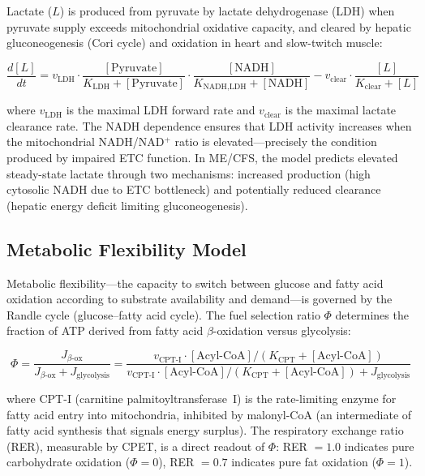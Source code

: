 Lactate ($L$) is produced from pyruvate by lactate dehydrogenase (LDH) when pyruvate supply exceeds mitochondrial oxidative capacity, and cleared by hepatic gluconeogenesis (Cori cycle) and oxidation in heart and slow-twitch muscle:

\begin{equation}
\label{eq:lactate-dynamics}
\frac{d[L]}{dt} = v_{\text{LDH}} \cdot \frac{[\text{Pyruvate}]}{K_{\text{LDH}} + [\text{Pyruvate}]} \cdot \frac{[\text{NADH}]}{K_{\text{NADH,LDH}} + [\text{NADH}]} - v_{\text{clear}} \cdot \frac{[L]}{K_{\text{clear}} + [L]}
\end{equation}

where $v_{\text{LDH}}$ is the maximal LDH forward rate and $v_{\text{clear}}$ is the maximal lactate clearance rate. The NADH dependence ensures that LDH activity increases when the mitochondrial NADH/NAD$^+$ ratio is elevated---precisely the condition produced by impaired ETC function. In ME/CFS, the model predicts elevated steady-state lactate through two mechanisms: increased production (high cytosolic NADH due to ETC bottleneck) and potentially reduced clearance (hepatic energy deficit limiting gluconeogenesis).

\subsection{Metabolic Flexibility Model}

Metabolic flexibility---the capacity to switch between glucose and fatty acid oxidation according to substrate availability and demand---is governed by the Randle cycle (glucose--fatty acid cycle). The fuel selection ratio $\Phi$ determines the fraction of ATP derived from fatty acid $\beta$-oxidation versus glycolysis:

\begin{equation}
\label{eq:fuel-selection}
\Phi = \frac{J_{\beta\text{-ox}}}{J_{\beta\text{-ox}} + J_{\text{glycolysis}}} = \frac{v_{\text{CPT-I}} \cdot [\text{Acyl-CoA}] / (K_{\text{CPT}} + [\text{Acyl-CoA}])}{v_{\text{CPT-I}} \cdot [\text{Acyl-CoA}] / (K_{\text{CPT}} + [\text{Acyl-CoA}]) + J_{\text{glycolysis}}}
\end{equation}

where CPT-I (carnitine palmitoyltransferase~I) is the rate-limiting enzyme for fatty acid entry into mitochondria, inhibited by malonyl-CoA (an intermediate of fatty acid synthesis that signals energy surplus). The respiratory exchange ratio (RER), measurable by CPET, is a direct readout of $\Phi$: RER $= 1.0$ indicates pure carbohydrate oxidation ($\Phi = 0$), RER $= 0.7$ indicates pure fat oxidation ($\Phi = 1$).

